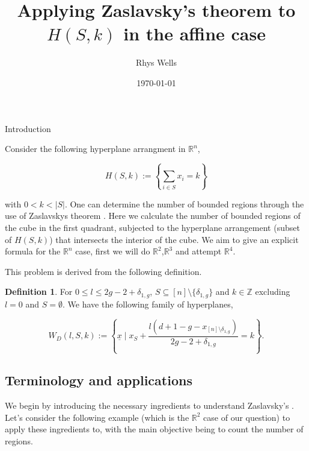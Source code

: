 \documentclass[a4paper,12pt]{article}
\title{Applying Zaslavsky's theorem to $H(S,k)$ in the affine case}
\author{Rhys Wells}
\date{\today}
\newcounter{example}[]
\theoremstyle{definition}
\newtheorem{definition}{Definition}[section]
\theoremstyle{indented}
\begin{document}
\maketitle
\tableofcontents


\begin{section}{Introduction}

Consider the following hyperplane arrangment in $\mathbb{R}^n$, 

\begin{equation}\label{HSK}
    H(S,k):= \left\{ \sum_{i\in S} x_i = k \right\}
\end{equation}

 
 with $0<k<|S|$. One can determine the number of bounded regions through the use of Zaslavskys theorem \cite[Lect 1,2]{stanley2004introduction}. Here we calculate the number of bounded regions of the cube in the first quadrant, subjected to the hyperplane arrangement (subset of $H(S,k)$) that intersects the interior of the cube. We aim to give an explicit formula for the $\mathbb{R}^n$ case, first we will do $\mathbb{R}^2$,$\mathbb{R}^3$ and attempt $\mathbb{R}^4$.

 
 This problem is derived from the following definition.
 
  \begin{definition}\label{planefam} \cite[Equation (27), page 21]{kass2019stability}  For $0\le l \le 2g-2 + \delta_{1,g}$, $S\subseteq [n] \setminus \{\delta_{1,g}\}$ and $k\in \mathbb{Z}$ excluding $l=0$ and $S=\emptyset$. We have the following family of hyperplanes,

$$W_D(l,S,k):= \left\{ \underline{x} \mid x_S + \frac{ l(d+1-g - x_{[n]\setminus{\delta_{1,g}} } ) } {2g-2+\delta_{1,g}} = k \right\}. $$
\end{definition}


\section{Terminology and applications}

We begin by introducing the necessary ingredients to understand Zaslavsky's \cite[Lec 1,2]{stanley2004introduction}. Let's consider the following example (which is the $\mathbb{R}^2$ case of our question) to apply these ingredients to, with the main objective being to count the number of regions.


\end{section}
\end{document}
